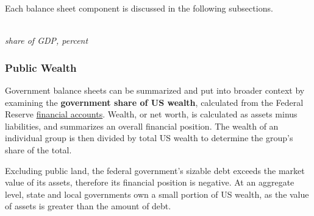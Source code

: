 \begin{minipage}{0.32\textwidth}
\small  Each balance sheet component is discussed in the following subsections.
\end{minipage}\hspace{6mm}\begin{minipage}{0.40\textwidth}
\\
\footnotesize{\textit{share of GDP, percent}}\\
\end{minipage}
\vspace{1mm}

\subsubsection*{Public Wealth}
\begin{minipage}{0.76\textwidth}
\vspace*{-1mm}

\small Government balance sheets can be summarized and put into broader context by examining the \textbf{government share of US wealth}, calculated from the Federal Reserve \href{https://www.federalreserve.gov/releases/z1/}{financial accounts}. Wealth, or net worth, is calculated as assets minus liabilities, and summarizes an overall financial position. The wealth of an individual group is then divided by total US wealth to determine the group's share of the total.

Excluding public land, the federal government's sizable debt exceeds the market value of its assets, therefore its financial position is negative. At an aggregate level, state and local governments own a small portion of US wealth, as the value of assets is greater than the amount of debt. 
\end{minipage}

